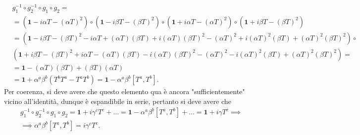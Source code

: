 \begin{align}
    &g_1^{-1} \circ g_2^{-1} \circ g_1 \circ g_2 =  \\
    &= (\mathbf{1} - i \alpha T - (\alpha T)^2) \circ (\mathbf{1} - i \beta T - (\beta T)^2) \circ (\mathbf{1} + i \alpha T - (\alpha T)^2) \circ (\mathbf{1} + i \beta T - (\beta T)^2) \\
    &= (\mathbf{1} - i \beta T - (\beta T)^2 - i \alpha T + (\alpha T) (\beta T) + i (\alpha T) (\beta T)^2 - (\alpha T)^2 + i (\alpha T)^2 (\beta T) + (\alpha T)^2 (\beta T)^2) \circ \\
    &( \mathbf{1} + i \beta T - (\beta T)^2 + i \alpha T - (\alpha T)(\beta T) - i (\alpha T)(\beta T)^2 - (\alpha T)^2 - i (\alpha T)^2 (\beta T) + (\alpha T)^2 (\beta T)^2) = \\
    &= \mathbf{1} - (\alpha T)(\beta T) + (\beta T)(\alpha T) \\
    &= \mathbf{1} + \alpha^a \beta^b(T^b T^a - T^a T^b) = \mathbf{1} - \alpha^a \beta^b [T^a, T^b].
\end{align}
Per coerenza, si deve avere che questo elemento qua è ancora "sufficientemente" vicino all'identità, dunque è espandibile in serie, pertanto si deve avere che
\begin{align}
    &g_1^{-1} \circ g_2^{-1} \circ g_1 \circ g_2 = \mathbf{1} + i \gamma^c T^c + \ldots = \mathbf{1} - \alpha^a \beta^b [T^a, T^b] + \ldots = \mathbf{1} + i \gamma T^c \implies \\
    &\implies \alpha^a \beta^b [T^a, T^b] = i \gamma^c T^c.
\end{align}

